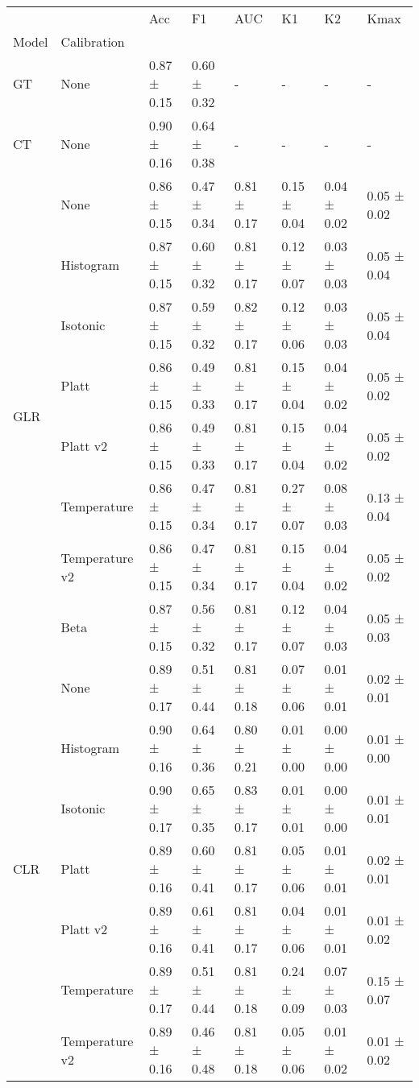 \begin{tabular}{llllllll}
\toprule
 &  & Acc & F1 & AUC & K1 & K2 & Kmax \\
Model & Calibration &  &  &  &  &  &  \\
\midrule
GT & None & 0.87 ± 0.15 & 0.60 ± 0.32 & - & - & - & - \\
\cline{1-8}
CT & None & 0.90 ± 0.16 & 0.64 ± 0.38 & - & - & - & - \\
\cline{1-8}
\multirow[t]{8}{*}{GLR} & None & 0.86 ± 0.15 & 0.47 ± 0.34 & 0.81 ± 0.17 & 0.15 ± 0.04 & 0.04 ± 0.02 & 0.05 ± 0.02 \\
 & Histogram & 0.87 ± 0.15 & 0.60 ± 0.32 & 0.81 ± 0.17 & 0.12 ± 0.07 & 0.03 ± 0.03 & 0.05 ± 0.04 \\
 & Isotonic & 0.87 ± 0.15 & 0.59 ± 0.32 & 0.82 ± 0.17 & 0.12 ± 0.06 & 0.03 ± 0.03 & 0.05 ± 0.04 \\
 & Platt & 0.86 ± 0.15 & 0.49 ± 0.33 & 0.81 ± 0.17 & 0.15 ± 0.04 & 0.04 ± 0.02 & 0.05 ± 0.02 \\
 & Platt v2 & 0.86 ± 0.15 & 0.49 ± 0.33 & 0.81 ± 0.17 & 0.15 ± 0.04 & 0.04 ± 0.02 & 0.05 ± 0.02 \\
 & Temperature & 0.86 ± 0.15 & 0.47 ± 0.34 & 0.81 ± 0.17 & 0.27 ± 0.07 & 0.08 ± 0.03 & 0.13 ± 0.04 \\
 & Temperature v2 & 0.86 ± 0.15 & 0.47 ± 0.34 & 0.81 ± 0.17 & 0.15 ± 0.04 & 0.04 ± 0.02 & 0.05 ± 0.02 \\
 & Beta & 0.87 ± 0.15 & 0.56 ± 0.32 & 0.81 ± 0.17 & 0.12 ± 0.07 & 0.04 ± 0.03 & 0.05 ± 0.03 \\
\cline{1-8}
\multirow[t]{8}{*}{CLR} & None & 0.89 ± 0.17 & 0.51 ± 0.44 & 0.81 ± 0.18 & 0.07 ± 0.06 & 0.01 ± 0.01 & 0.02 ± 0.01 \\
 & Histogram & 0.90 ± 0.16 & 0.64 ± 0.36 & 0.80 ± 0.21 & 0.01 ± 0.00 & 0.00 ± 0.00 & 0.01 ± 0.00 \\
 & Isotonic & 0.90 ± 0.17 & 0.65 ± 0.35 & 0.83 ± 0.17 & 0.01 ± 0.01 & 0.00 ± 0.00 & 0.01 ± 0.01 \\
 & Platt & 0.89 ± 0.16 & 0.60 ± 0.41 & 0.81 ± 0.17 & 0.05 ± 0.06 & 0.01 ± 0.01 & 0.02 ± 0.01 \\
 & Platt v2 & 0.89 ± 0.16 & 0.61 ± 0.41 & 0.81 ± 0.17 & 0.04 ± 0.06 & 0.01 ± 0.01 & 0.01 ± 0.02 \\
 & Temperature & 0.89 ± 0.17 & 0.51 ± 0.44 & 0.81 ± 0.18 & 0.24 ± 0.09 & 0.07 ± 0.03 & 0.15 ± 0.07 \\
 & Temperature v2 & 0.89 ± 0.16 & 0.46 ± 0.48 & 0.81 ± 0.18 & 0.05 ± 0.06 & 0.01 ± 0.02 & 0.01 ± 0.02 \\

\end{tabular}
